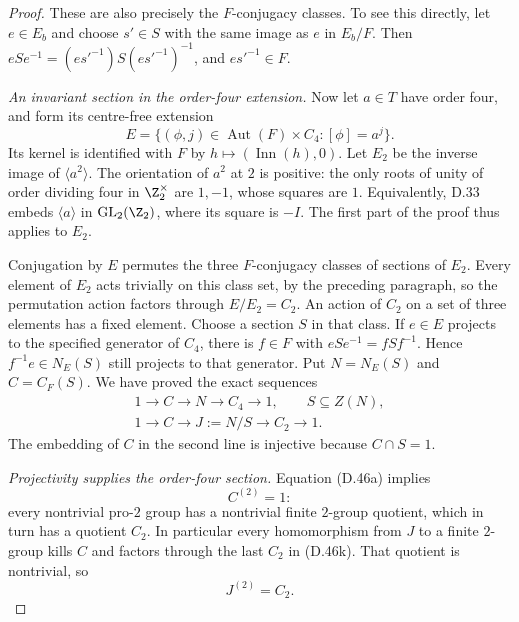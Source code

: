 \begin{proof}
These are also precisely the $F$-conjugacy classes.
To see this directly, let $e\in E_b$ and choose
$s'\in S$ with the same image as $e$ in $E_b/F$.
Then $eS e^{-1}=(es'^{-1})S(es'^{-1})^{-1}$,
and $es'^{-1}\in F$.

\emph{An invariant section in the order-four extension.}
Now let $a\in T$ have order four, and form its
centre-free extension
\[
 E=\{(\phi,j)\in\operatorname{Aut}(F)\times C_4:
                                      [\phi]=a^j\}.
                                                        \tag{D.46j}
\]
Its kernel is identified with $F$ by
$h\mapsto(\operatorname{Inn}(h),0)$.
Let $E_2$ be the inverse image of $\langle a^2\rangle$.
The orientation of $a^2$ at $2$ is positive:
the only roots of unity of order dividing four
in $\Z_2^\times$ are $1,-1$, whose squares are $1$.
Equivalently, D.33 embeds $\langle a\rangle$ in
$\operatorname{GL}_2(\Z_2)$, where its square is $-I$.
The first part of the proof thus applies to $E_2$.

Conjugation by $E$ permutes the three $F$-conjugacy
classes of sections of $E_2$.
Every element of $E_2$ acts trivially on this class
set, by the preceding paragraph, so the permutation
action factors through $E/E_2=C_2$.
An action of $C_2$ on a set of three elements has a
fixed element.
Choose a section $S$ in that class.
If $e\in E$ projects to the specified generator of
$C_4$, there is $f\in F$ with
$eSe^{-1}=fSf^{-1}$.
Hence $f^{-1}e\in N_E(S)$ still projects to that
generator.
Put $N=N_E(S)$ and $C=C_F(S)$.
We have proved the exact sequences
\[
 \begin{gathered}
 1\longrightarrow C\longrightarrow N
              \longrightarrow C_4\longrightarrow1,
       \qquad S\subseteq Z(N),\\
 1\longrightarrow C\longrightarrow J:=N/S
              \longrightarrow C_2\longrightarrow1.
 \end{gathered}                                         \tag{D.46k}
\]
The embedding of $C$ in the second line is injective
because $C\cap S=1$.

\emph{Projectivity supplies the order-four section.}
Equation (D.46a) implies
\[
                              C^{(2)}=1:                \tag{D.46l}
\]
every nontrivial pro-$2$ group has a nontrivial finite
$2$-group quotient, which in turn has a quotient
$C_2$.
In particular every homomorphism from $J$ to a finite
$2$-group kills $C$ and factors through the last
$C_2$ in (D.46k).  That quotient is nontrivial, so
\[
                              J^{(2)}=C_2.              \tag{D.46m}
\]


\end{proof}
